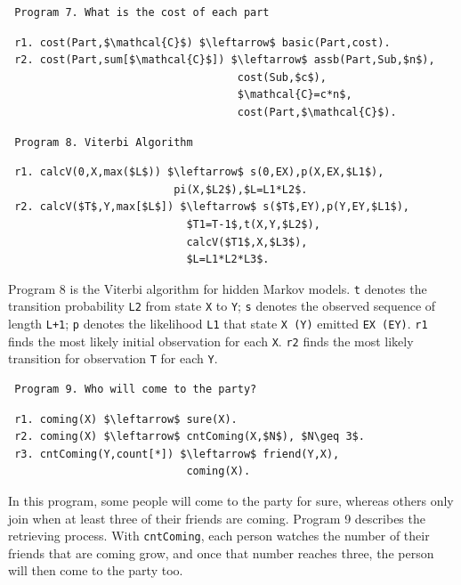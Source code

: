 \begin{appendix}
 \begin{verbatim}
 Program 7. What is the cost of each part
 \end{verbatim}\vspace{-0.1in}\small
 \begin{lstlisting}
 r1. cost(Part,$\mathcal{C}$) $\leftarrow$ basic(Part,cost).
 r2. cost(Part,sum[$\mathcal{C}$]) $\leftarrow$ assb(Part,Sub,$n$),
                                    cost(Sub,$c$),
                                    $\mathcal{C}=c*n$,
                                    cost(Part,$\mathcal{C}$).
 \end{lstlisting}
 \normalsize

 \begin{verbatim}
 Program 8. Viterbi Algorithm
 \end{verbatim}\vspace{-0.1in}\small
 \begin{lstlisting}
 r1. calcV(0,X,max($L$)) $\leftarrow$ s(0,EX),p(X,EX,$L1$),
                          pi(X,$L2$),$L=L1*L2$.
 r2. calcV($T$,Y,max[$L$]) $\leftarrow$ s($T$,EY),p(Y,EY,$L1$),
                            $T1=T-1$,t(X,Y,$L2$),
                            calcV($T1$,X,$L3$),
                            $L=L1*L2*L3$.
 \end{lstlisting}
 \normalsize
 
 Program 8 \cite{7113340} is the Viterbi algorithm for hidden Markov models. \texttt{t} denotes the transition probability \texttt{L2} from state \texttt{X} to \texttt{Y}; \texttt{s} denotes the observed sequence of length \texttt{L+1}; \texttt{p} denotes the likelihood \texttt{L1} that state \texttt{X (Y)} emitted \texttt{EX (EY)}. \texttt{r1} finds the most likely initial observation for each \texttt{X}. \texttt{r2} finds the most likely transition for observation \texttt{T} for each \texttt{Y}.
 
 \begin{verbatim}
 Program 9. Who will come to the party?
 \end{verbatim}\small
 \begin{lstlisting}
 r1. coming(X) $\leftarrow$ sure(X).
 r2. coming(X) $\leftarrow$ cntComing(X,$N$), $N\geq 3$.
 r3. cntComing(Y,count[*]) $\leftarrow$ friend(Y,X),
                            coming(X).
 \end{lstlisting}
 \normalsize
 
 In this program, some people will come to the party for sure, whereas others only join when at least three of their friends are coming. Program 9 \cite{7113340} describes the retrieving process. With \texttt{cntComing}, each person watches the number of their friends that are coming grow, and once that number reaches three, the person will then come to the party too.
 

\end{appendix}
